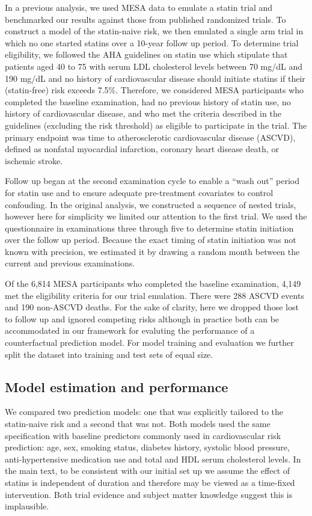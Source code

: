 In a previous analysis, we used MESA data to emulate a statin trial and benchmarked our results against those from published randomized trials. To construct a model of the statin-naive risk, we then emulated a single arm trial in which no one started statins over a 10-year follow up period. To determine trial eligibility, we followed the AHA guidelines \cite{grundy_scott_m_2018_2019} on statin use which stipulate that patients aged 40 to 75 with serum LDL cholesterol levels between 70 mg/dL and 190 mg/dL and no history of cardiovascular disease should initiate statins if their (statin-free) risk exceeds 7.5\%. Therefore, we considered MESA participants who completed the baseline examination, had no previous history of statin use, no history of cardiovascular disease, and who met the criteria described in the guidelines (excluding the risk threshold) as eligible to participate in the trial. The primary endpoint was time to atherosclerotic cardiovascular disease (ASCVD), defined as nonfatal myocardial infarction, coronary heart disease death, or ischemic stroke. 

Follow up began at the second examination cycle to enable a ``wash out'' period for statin use and to ensure adequate pre-treatment covariates to control confouding. In the original analysis, we constructed a sequence of nested trials, however here for simplicity we limited our attention to the first trial. We used the questionnaire in examinations three through five to determine statin initiation over the follow up period. Because the exact timing of statin initiation was not known with precision, we estimated it by drawing a random month between the current and previous examinations. 

Of the 6,814 MESA participants who completed the baseline examination, 4,149 met the eligibility criteria for our trial emulation. There were 288 ASCVD events and 190 non-ASCVD deaths. For the sake of clarity, here we dropped those lost to follow up and ignored competing risks although in practice both can be accommodated in our framework for evaluting the performance of a counterfactual prediction model. For model training and evaluation we further split the dataset into training and test sets of equal size. 

\subsection{Model estimation and performance}

We compared two prediction models: one that was explicitly tailored to the statin-naive risk and a second that was not. Both models used the same specification with baseline predictors commonly used in cardiovascular risk prediction: age, sex, smoking status, diabetes history, systolic blood pressure, anti-hypertensive medication use and total and HDL serum cholesterol levels. In the main text, to be consistent with our initial set up we assume the effect of statins is independent of duration and therefore may be viewed as a time-fixed intervention. Both trial evidence and subject matter knowledge suggest this is implausible.

